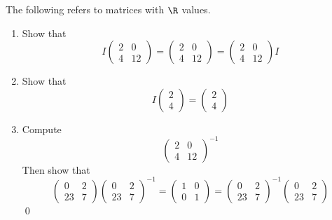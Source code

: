   The following refers to matrices with $\R$ values.
  \begin{enumerate}[nosep]

    \item
    Show that
    \[
    I
    \begin{pmatrix}
      2 & 0 \\
      4 & 12 
    \end{pmatrix}
    =
    \begin{pmatrix}
      2 & 0 \\
      4 & 12 
    \end{pmatrix}
    =
    \begin{pmatrix}
      2 & 0 \\
      4 & 12 
    \end{pmatrix}
    I
    \]

    \item
    Show that
    \[
    I
    \begin{pmatrix}
      2 \\
      4 
    \end{pmatrix}
    =
    \begin{pmatrix}
      2 \\
      4 
    \end{pmatrix}
    \]
    
    \item
    Compute
    \[
    \begin{pmatrix}
      2 & 0 \\
      4 & 12 
    \end{pmatrix}^{-1}
    \]
    Then show that
    \[
    \begin{pmatrix}
      0 & 2 \\
      23 & 7 
    \end{pmatrix}
    \begin{pmatrix}
      0 & 2 \\
      23 & 7 
    \end{pmatrix}^{-1}
    =
    \begin{pmatrix}
      1 & 0 \\
      0 & 1 
    \end{pmatrix}
    =
    \begin{pmatrix}
      0 & 2 \\
      23 & 7 
    \end{pmatrix}^{-1}
    \begin{pmatrix}
      0 & 2 \\
      23 & 7 
    \end{pmatrix}    
    \]
  \qed    
  \end{enumerate}
